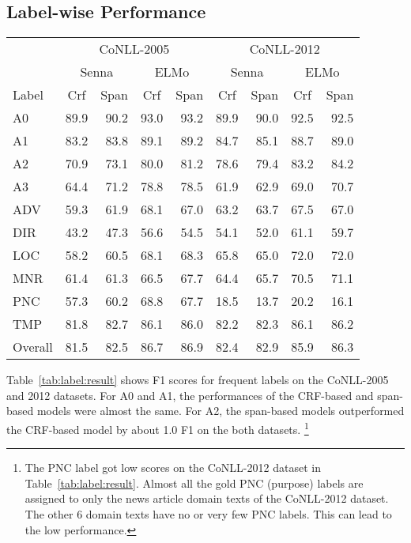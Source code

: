 \documentclass[11pt,a4paper]{article}
\begin{document}
\subsection*{Label-wise Performance}
\begin{table*}[t]
  \centering
  {\small
  \begin{tabular}{l|rrrr|rrrr} \toprule
   & \multicolumn{4}{c}{CoNLL-2005} & \multicolumn{4}{c}{CoNLL-2012} \\
   & \multicolumn{2}{c}{\sc Senna} & \multicolumn{2}{c}{\sc ELMo} & \multicolumn{2}{c}{\sc Senna} & \multicolumn{2}{c}{\sc ELMo} \\
   Label & \multicolumn{1}{c}{\sc Crf} & \multicolumn{1}{c}{\sc Span} & \multicolumn{1}{c}{\sc Crf} & \multicolumn{1}{c}{\sc Span} & \multicolumn{1}{c}{\sc Crf} & \multicolumn{1}{c}{\sc Span} & \multicolumn{1}{c}{\sc Crf} & \multicolumn{1}{c}{\sc Span} \\ \hline
   A0   & 89.9 & 90.2 &  93.0 & 93.2 & 89.9 & 90.0 & 92.5 & 92.5\\
   A1   & 83.2 & 83.8 &  89.1& 89.2  & 84.7 & 85.1 & 88.7 & 89.0\\
   A2   & 70.9 &  73.1 &  80.0 & 81.2 & 78.6 & 79.4 & 83.2 & 84.2\\
   A3   & 64.4 &  71.2 &  78.8 & 78.5 & 61.9 & 62.9 & 69.0 & 70.7\\
   ADV & 59.3 & 61.9 & 68.1 & 67.0 & 63.2 & 63.7 & 67.5 & 67.0\\
   DIR & 43.2 &  47.3 &  56.6& 54.5 & 54.1 & 52.0 & 61.1 & 59.7\\
   LOC        & 58.2 &  60.5 &  68.1& 68.3 & 65.8 & 65.0 & 72.0 & 72.0\\
   MNR & 61.4 & 61.3 &  66.5& 67.7 & 64.4 &  65.7& 70.5 & 71.1\\
   PNC & 57.3 & 60.2 &  68.8& 67.7 & 18.5 & 13.7 & 20.2 & 16.1\\
   TMP & 81.8 & 82.7 & 86.1 & 86.0 & 82.2 & 82.3 & 86.1 & 86.2\\ \hline
   Overall & 81.5 & 82.5 & 86.7 & 86.9 & 82.4 & 82.9 & 85.9 & 86.3\\ \toprule
  \end{tabular}
  }
  \caption{\label{tab:label:result} F1 Scores for frequent labels on the development set of the CoNLL-2005 and 2012 datasets.}
\end{table*}

Table~\ref{tab:label:result} shows F1 scores for frequent labels on the CoNLL-2005 and 2012 datasets.
For A0 and A1, the performances of the CRF-based and span-based models were almost the same.
For A2, the span-based models outperformed the CRF-based model by about 1.0 F1 on the both datasets.
\footnote{The PNC label got low scores on the CoNLL-2012 dataset in Table\ \ref{tab:label:result}. Almost all the gold PNC (purpose) labels are assigned to only the news article domain texts of the CoNLL-2012 dataset. The other 6 domain texts have no or very few PNC labels. This can lead to the low performance.}
\end{document}
